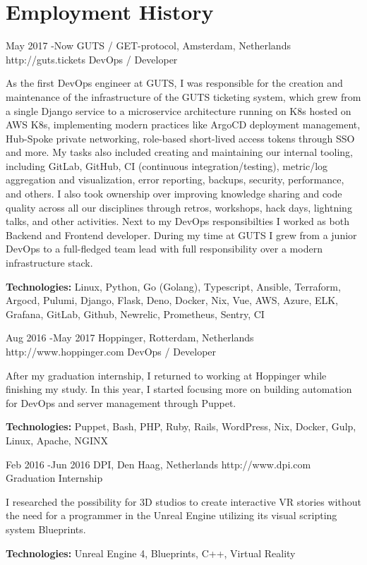 \documentclass[10pt]{article} %
\begin{document}

\section{Employment History}

\job
{May 2017 -}{Now}
{GUTS / GET-protocol, Amsterdam, Netherlands}
{http://guts.tickets}
{DevOps / Developer}
{As the first DevOps engineer at GUTS, I was responsible for the creation and maintenance of the infrastructure of the GUTS ticketing system, which grew from a single Django service to a microservice architecture running on K8s hosted on AWS K8s, implementing modern practices like ArgoCD deployment management, Hub-Spoke private networking, role-based short-lived access tokens through SSO and more. My tasks also included creating and maintaining our internal tooling, including GitLab, GitHub, CI (continuous integration/testing), metric/log aggregation and visualization, error reporting, backups, security, performance, and others. I also took ownership over improving knowledge sharing and code quality across all our disciplines through retros, workshops, hack days, lightning talks, and other activities. Next to my DevOps responsibilties I worked as both Backend and Frontend developer. During my time at GUTS I grew from a junior DevOps to a full-fledged team lead with full responsibility over a modern infrastructure stack.

\rule{0mm}{5mm}\textbf{Technologies:} Linux, Python, Go (Golang), Typescript, Ansible, Terraform, Argocd, Pulumi, Django, Flask, Deno, Docker, Nix, Vue, AWS, Azure, ELK, Grafana, GitLab, Github, Newrelic, Prometheus, Sentry, CI}

\job
{Aug 2016 -}{May 2017}
{Hoppinger, Rotterdam, Netherlands}
{http://www.hoppinger.com}
{DevOps / Developer}
{After my graduation internship, I returned to working at Hoppinger while finishing my study. In this year, I started focusing more on building automation for DevOps and server management through Puppet.

\rule{0mm}{5mm}\textbf{Technologies:} Puppet, Bash, PHP, Ruby, Rails, WordPress, Nix, Docker, Gulp, Linux, Apache, NGINX }

\job
{Feb 2016 -}{Jun 2016}
{DPI, Den Haag, Netherlands}
{http://www.dpi.com}
{Graduation Internship}
{I researched the possibility for 3D studios to create interactive VR stories without the need for a programmer in the Unreal Engine utilizing its visual scripting system Blueprints.\\

\rule{0mm}{5mm}\textbf{Technologies:} Unreal Engine 4, Blueprints, C++, Virtual Reality}
\end{document}
